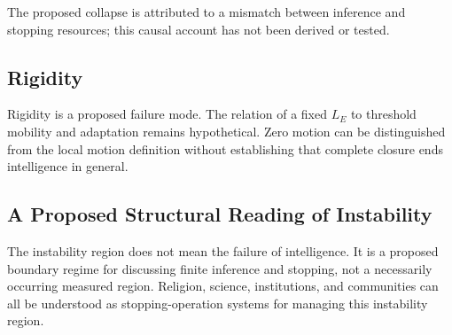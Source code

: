 The proposed collapse is attributed to a mismatch between inference and stopping resources; this causal account has not been derived or tested.

\subsection{Rigidity}

Rigidity is a proposed failure mode. The relation of a fixed $L_E$ to threshold mobility and adaptation remains hypothetical. Zero motion can be distinguished from the local motion definition without establishing that complete closure ends intelligence in general.

\subsection{A Proposed Structural Reading of Instability}

The instability region does not mean the failure of intelligence. It is a proposed boundary regime for discussing finite inference and stopping, not a necessarily occurring measured region. Religion, science, institutions, and communities can all be understood as stopping-operation systems for managing this instability region.

\bigskip
